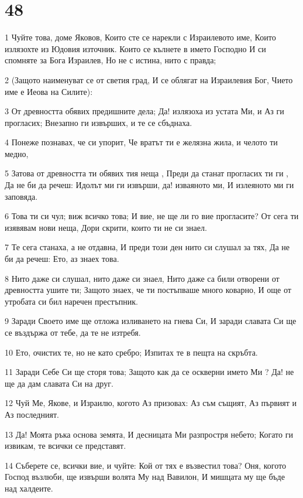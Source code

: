 \chapter{48}

\par 1 Чуйте това, доме Яковов, Които сте се нарекли с Израилевото име, Които излязохте из Юдовия източник. Които се кълнете в името Господно И си спомняте за Бога Израилев, Но не с истина, нито с правда;
\par 2 (Защото наименуват се от светия град, И се облягат на Израилевия Бог, Чието име е Иеова на Силите):
\par 3 От древността обявих предишните дела; Да! излязоха из устата Ми, и Аз ги прогласих; Внезапно ги извърших, и те се сбъднаха.
\par 4 Понеже познавах, че си упорит, Че вратът ти е желязна жила, и челото ти медно,
\par 5 Затова от древността ти обявих тия неща , Преди да станат прогласих ти ги , Да не би да речеш: Идолът ми ги извърши, да! изваяното ми, И излеяното ми ги заповяда.
\par 6 Това ти си чул; виж всичко това; И вие, не ще ли го вие прогласите? От сега ти изявявам нови неща, Дори скрити, които ти не си знаел.
\par 7 Те сега станаха, а не отдавна, И преди този ден нито си слушал за тях, Да не би да речеш: Ето, аз знаех това.
\par 8 Нито даже си слушал, нито даже си знаел, Нито даже са били отворени от древността ушите ти; Защото знаех, че ти постъпваше много коварно, И още от утробата си бил наречен престъпник.
\par 9 Заради Своето име ще отложа изливането на гнева Си, И заради славата Си ще се въздържа от тебе, да те не изтребя.
\par 10 Ето, очистих те, но не като сребро; Изпитах те в пещта на скръбта.
\par 11 Заради Себе Си ще сторя това; Защото как да се оскверни името Ми ? Да! не ще да дам славата Си на друг.
\par 12 Чуй Ме, Якове, и Израилю, когото Аз призовах: Аз съм същият, Аз първият и Аз последният.
\par 13 Да! Моята ръка основа земята, И десницата Ми разпростря небето; Когато ги извикам, те всички се представят.
\par 14 Съберете се, всички вие, и чуйте: Кой от тях е възвестил това? Оня, когото Господ възлюби, ще извърши волята Му над Вавилон, И мишцата му ще бъде над халдеите.
